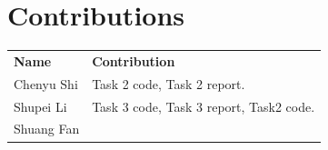 \documentclass{article}
\begin{document}
\section*{Contributions}
\begin{tabular}{ll}
    \textbf{Name} & \textbf{Contribution}\\
    Chenyu Shi & Task 2 code, Task 2 report.\\
    Shupei Li & Task 3 code, Task 3 report, Task2 code.\\
    Shuang Fan & \\
\end{tabular}
\end{document}

